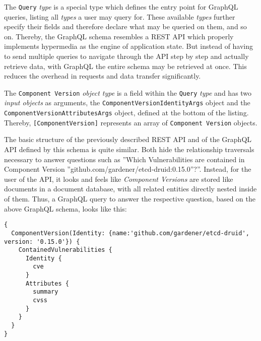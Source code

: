 The \lstinline|Query| \emph{type} is a special type which defines the entry point for GraphQL queries, listing all \emph{types} a user may query for. These available \emph{types} further specify their fields and therefore declare what may be queried on them, and so on. Thereby, the GraphQL schema resembles a REST API which properly implements hypermedia as the engine of application state. But instead of having to send multiple queries to navigate through the API step by step and actually retrieve data, with GraphQL the entire schema may be retrieved at once. This reduces the overhead in requests and data transfer significantly.\par
The \lstinline|Component Version| \emph{object type} is a field within the \lstinline|Query| \emph{type} and has two \emph{input objects} as arguments, the \lstinline|ComponentVersionIdentityArgs| object and the \lstinline|ComponentVersionAttributesArgs| object, defined at the bottom of the listing. Thereby, \lstinline|[ComponentVersion]| represents an array of \lstinline|Component Version| objects.\par 
The basic structure of the previously described REST API and of the GraphQL API defined by this schema is quite similar. Both hide the relationship traversals necessary to answer questions such as ''Which Vulnerabilities are contained in Component Version ''github.com/gardener/etcd-druid:0.15.0''?''. Instead, for the user of the API, it looks and feels like \emph{Component Versions} are stored like documents in a document database, with all related entities directly nested inside of them. Thus, a GraphQL query to answer the respective question, based on the above GraphQL schema, looks like this:\\

\begin{lstlisting}[caption=GraphQL Query, captionpos=b, label=lst:GraphQLQuery]
{
  ComponentVersion(Identity: {name:'github.com/gardener/etcd-druid', version: '0.15.0'}) {
    ContainedVulnerabilities {
      Identity {
        cve
      }
      Attributes {
        summary
        cvss 
      }
    }
  }
}
\end{lstlisting}

